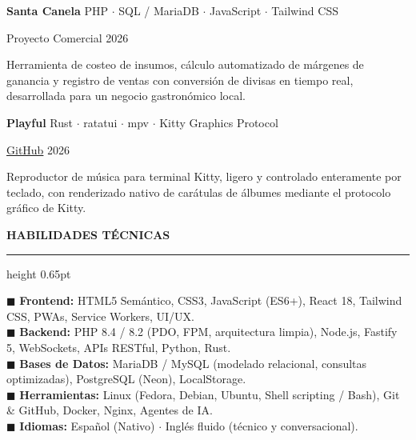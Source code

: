 \documentclass[11pt,letterpaper]{article}
\newcommand{\cvsection}[1]{%
  \vspace{4pt}%
  {\color{primarydark}\textbf{\small\bfseries #1}}%
  \par\vspace{1.2pt}%
  {\color{rulebeige}\hrule height 0.65pt}%
  \vspace{2.5pt}%
}
\newcommand{\cvproject}[4]{%
  \textbf{#1} \hfill {\footnotesize\color{textmuted} #2}%
  \par\vspace{0.5pt}%
  {\footnotesize \color{linkbrown}#3} \hfill {\footnotesize\color{textmuted} #4}%
  \par\vspace{0.8pt}%
}
\begin{document}
\vspace{1.5pt}
\cvproject{Santa Canela}{PHP $\cdot$ SQL / MariaDB $\cdot$ JavaScript $\cdot$ Tailwind CSS}{Proyecto Comercial}{2026}
Herramienta de costeo de insumos, cálculo automatizado de márgenes de ganancia y registro de ventas con conversión de divisas en tiempo real, desarrollada para un negocio gastronómico local.

\vspace{1.5pt}
\cvproject{Playful}{Rust $\cdot$ ratatui $\cdot$ mpv $\cdot$ Kitty Graphics Protocol}{\href{https://github.com/fernandorodriguezrada/playful}{GitHub}}{2026}
Reproductor de música para terminal Kitty, ligero y controlado enteramente por teclado, con renderizado nativo de carátulas de álbumes mediante el protocolo gráfico de Kitty.

\cvsection{HABILIDADES TÉCNICAS}
{\color{primary}\footnotesize$\blacksquare$} \textbf{Frontend:} HTML5 Semántico, CSS3, JavaScript (ES6+), React 18, Tailwind CSS, PWAs, Service Workers, UI/UX.\\
{\color{primary}\footnotesize$\blacksquare$} \textbf{Backend:} PHP 8.4 / 8.2 (PDO, FPM, arquitectura limpia), Node.js, Fastify 5, WebSockets, APIs RESTful, Python, Rust.\\
{\color{primary}\footnotesize$\blacksquare$} \textbf{Bases de Datos:} MariaDB / MySQL (modelado relacional, consultas optimizadas), PostgreSQL (Neon), LocalStorage.\\
{\color{primary}\footnotesize$\blacksquare$} \textbf{Herramientas:} Linux (Fedora, Debian, Ubuntu, Shell scripting / Bash), Git \& GitHub, Docker, Nginx, Agentes de IA.\\
{\color{primary}\footnotesize$\blacksquare$} \textbf{Idiomas:} Español (Nativo) \enspace $\cdot$ \enspace Inglés fluido (técnico y conversacional).
\end{document}
